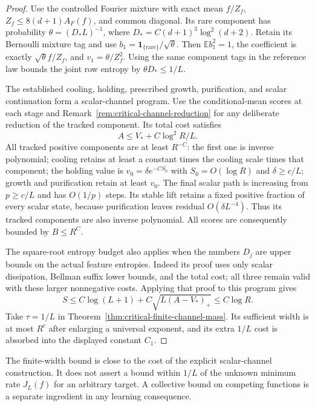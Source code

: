 \begin{proof}
Use the controlled Fourier mixture with exact mean $f/Z_f$,
$Z_f\le8(d+1)A_F(f)$, and common diagonal.  Its rare component
has probability $\theta=(D_*L)^{-1}$, where
$D_*=C(d+1)^3\log^2(d+2)$.  Retain its Bernoulli mixture tag and
use $b_1=\boldsymbol1_{\{\mathrm{rare}\}}/\sqrt\theta$.
Then $\mathbb E b_1^2=1$, the coefficient is exactly
$\sqrt\theta f/Z_f$, and $v_1=\theta/Z_f^2$.
Using the same component tags in the reference law bounds the joint
row entropy by $\theta D_*\le1/L$.

The established cooling, holding, prescribed growth, purification,
and scalar continuation form a scalar-channel program.  Use the
conditional-mean scores at each stage and
Remark~\ref{rem:critical-channel-reduction} for any deliberate
reduction of the tracked component.  Its total cost satisfies
\[
 A\le V_*+C\log^2R/L.
\]
All tracked positive components are at least $R^{-C}$: the first
one is inverse polynomial; cooling retains at least a constant times
the cooling scale times that component; the holding value is
$v_0=\delta e^{-C S_0}$ with $S_0=O(\log R)$ and
$\delta\ge c/L$; growth and purification retain at least $v_0$.
The final scalar path is increasing from $p\ge c/L$ and has
$O(1/p)$ steps.  Its stable lift retains a fixed positive fraction
of every scalar state, because purification leaves residual
$O(\delta L^{-4})$.  Thus its tracked components are also inverse
polynomial.  All scores are consequently bounded by $B\le R^C$.

The square-root entropy budget also applies when the numbers $D_j$
are upper bounds on the actual feature entropies.  Indeed its proof
uses only scalar dissipation, Bellman suffix lower bounds, and the
total cost; all three remain valid with these larger nonnegative
costs.  Applying that proof to this program gives
\[
 S\le C\log(L+1)+C\sqrt{L(A-V_*)_+}\le C\log R.
\]
Take $\tau=1/L$ in Theorem~\ref{thm:critical-finite-channel-mass}.
Its sufficient width is at most $R^c$ after enlarging a universal
exponent, and its extra $1/L$ cost is absorbed into the displayed
constant $C_1$.
\end{proof}

The finite-width bound is close to the cost of the explicit scalar-channel
construction.  It does not assert a bound within $1/L$ of the unknown
minimum rate $J_L(f)$ for an arbitrary target.  A collective bound on
competing functions is a separate ingredient in any learning consequence.
